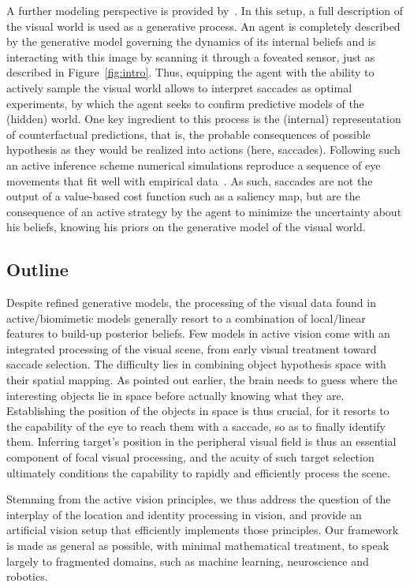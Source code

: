 A further modeling perspective is provided by~\cite{Friston12}. In this setup, a full description of the visual world is used as a generative process. An agent is completely described by the generative model governing the dynamics of its internal beliefs and is interacting with this image by scanning it through a foveated sensor, just as described in Figure~\ref{fig:intro}. Thus, equipping the agent with the ability to actively sample the visual world %
allows to interpret saccades as optimal experiments, by which the agent seeks to confirm predictive models of the (hidden) world. One key ingredient to this process is the (internal) representation of counterfactual predictions, that is, the probable consequences of possible hypothesis as they would be realized into actions (here, saccades). Following such an active inference scheme numerical simulations reproduce a sequence of eye movements that fit well with empirical data~\cite{Mirza18}. %
As such, saccades are not the output of a value-based cost function such as a saliency map, but
are the consequence of an active strategy by the agent to minimize the uncertainty about his beliefs, knowing his priors on the generative model of the visual world.

\subsection{Outline}

Despite refined generative models, the processing of the visual data found in active/biomimetic models generally resort to a combination of local/linear features to build-up posterior beliefs. Few models in active vision come with an integrated processing of the visual scene, from early visual treatment toward saccade selection. The difficulty lies in combining object hypothesis space with their spatial mapping. As pointed out earlier, the brain needs to guess where the interesting objects lie in space before actually knowing what they are. Establishing the position of the objects in space is thus crucial, for it resorts to the capability of the eye to reach them with a saccade, so as to finally identify them. Inferring target's position in the peripheral visual field is thus an essential component of focal visual processing, and the acuity of such target selection ultimately conditions the capability to rapidly and efficiently process the scene.

Stemming from the active vision principles, we thus address the question of the
interplay of the location and identity processing in vision,
and provide an artificial vision setup that efficiently implements those principles.
Our framework is made as general as possible, with minimal mathematical treatment, to speak largely to fragmented domains, such as machine learning, neuroscience and robotics.

